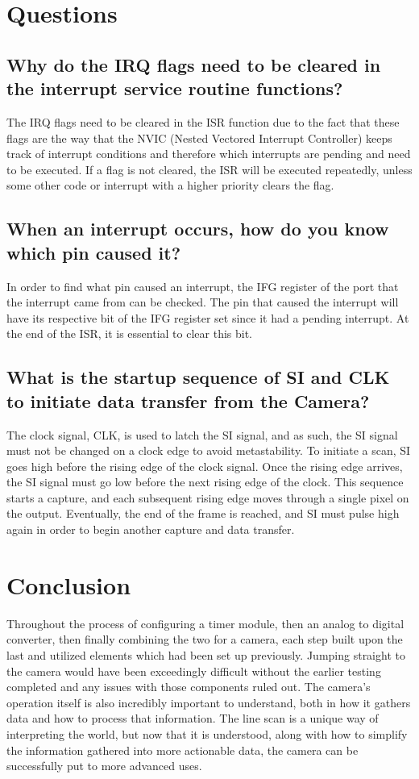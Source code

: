 \documentclass[conference]{IEEEtran}
\begin{document}
\section{Questions}

\subsection{Why do the IRQ flags need to be cleared in the interrupt service
routine functions?}

The IRQ flags need to be cleared in the ISR function due to the fact that
these flags are the way that the NVIC (Nested Vectored Interrupt Controller)
keeps track of interrupt conditions and therefore which interrupts are pending 
and need to be executed. If a flag is not cleared, the ISR will be executed 
repeatedly, unless some other code or interrupt with a higher priority clears 
the flag.

\subsection{When an interrupt occurs, how do you know which pin caused it?}

In order to find what pin caused an interrupt, the IFG register of the port
that the interrupt came from can be checked. The pin that caused the
interrupt will have its respective bit of the IFG register set since it had
a pending interrupt. At the end of the ISR, it is essential to clear this
bit.

\subsection{What is the startup sequence of SI and CLK to initiate data 
transfer from the Camera?}

The clock signal, CLK, is used to latch the SI signal, and as such, the SI
signal must not be changed on a clock edge to avoid metastability. To
initiate a scan, SI goes high before the rising edge of the clock signal.
Once the rising edge arrives, the SI signal must go low before the next
rising edge of the clock. This sequence starts a capture, and each subsequent
rising edge moves through a single pixel on the output. Eventually, the end
of the frame is reached, and SI must pulse high again in order to begin
another capture and data transfer.

\section{Conclusion}
Throughout the process of configuring a timer module, then an analog to 
digital converter, then finally combining the two for a camera, each step 
built upon the last and utilized elements which had been set up previously. 
Jumping straight to the camera would have been exceedingly difficult without the
earlier testing completed and any issues with those components ruled out. The
camera's operation itself is also incredibly important to understand, both in 
how it gathers data and how to process that information. The line scan is a 
unique way of interpreting the world, but now that it is understood, along 
with how to simplify the information gathered into more actionable data, the 
camera can be successfully put to more advanced uses.
\end{document}
